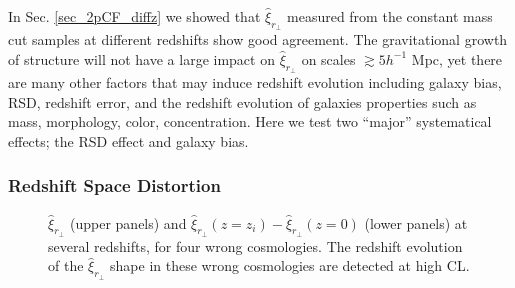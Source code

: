 \documentclass[iop]{emulateapj}
\begin{document}
In Sec. \ref{sec_2pCF_diffz} we showed that $\hat \xi_{r_\perp}$ measured from the
constant mass cut samples at different redshifts show good agreement.
The gravitational growth of structure will not have a large impact on $\hat \xi_{r_\perp}$ on scales $\gtrsim5 h^{-1}$ Mpc,
yet there are many other factors that may induce redshift evolution
including galaxy bias, RSD, redshift error, and 
the redshift evolution of galaxies properties 
such as mass, morphology, color, concentration. 
Here we test two ``major'' systematical effects;  the RSD effect and galaxy bias.



\subsubsection{Redshift Space Distortion}


\begin{figure}
   \caption{\label{fig_cosmo}
    $\hat{\xi}_{r_\perp}$ (upper panels) and $\hat{\xi}_{r_\perp}(z=z_i) - \hat{\xi}_{r_\perp}(z=0)$ (lower panels) at several redshifts,
    for four wrong cosmologies.
    The redshift evolution of the $\hat\xi_{r_{\perp}}$ shape in these wrong cosmologies are detected at high CL.
   }
\end{figure}
\end{document}
